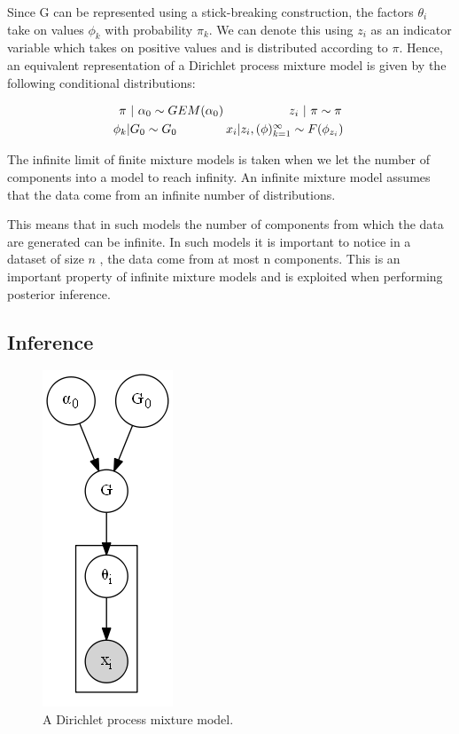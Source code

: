 \documentclass[twoside,hidelinks]{article}
\begin{document}
Since G can be represented using a stick-breaking construction, the factors $ \theta_i $ take on values $\phi_k$ with probability $\pi_k$. We can denote this using $z_i$ as an indicator variable which takes on positive values and is distributed according to \textbf{$\pi$}. Hence, an equivalent representation of a Dirichlet process mixture model  is given by the following conditional distributions:

	\begin{equation}
		\begin{aligned}
			\centerline{ \textbf{$\pi$} $|$  $ \alpha_0  \sim GEM(\alpha_0 )\ \ \ \ \ \ \ \ \ \ \ \ \ \ \ \   z_i$ $|$ \textbf{$ \pi \sim \pi  $} } \\
			\centerline{$ \phi_k | G_0 \sim G_0 $\ \ \ \ \ \ \ \ \ \ \ \ $x_i | z_i, (\phi )_{k=1}^\infty \sim F(\phi_{z_i}) $  } \\
		\end{aligned}
	\end{equation}

The infinite limit of finite mixture models is taken when we let the number of components into a model to reach infinity. An infinite mixture model assumes that the data come from an infinite number of distributions.

This means that in such models the number of components from which the data are generated can be infinite. In such models it is important to notice in a dataset of size $n$ , the data come from at most n components. This is an important property of infinite mixture models and is exploited when performing posterior inference.

\subsection{Inference}
\begin{figure}
          \centerline{\includegraphics[width=.17\textwidth]{dpmm3}}
	\caption{A Dirichlet process mixture model.}
	\label{mm}
\end{figure}
\end{document}
